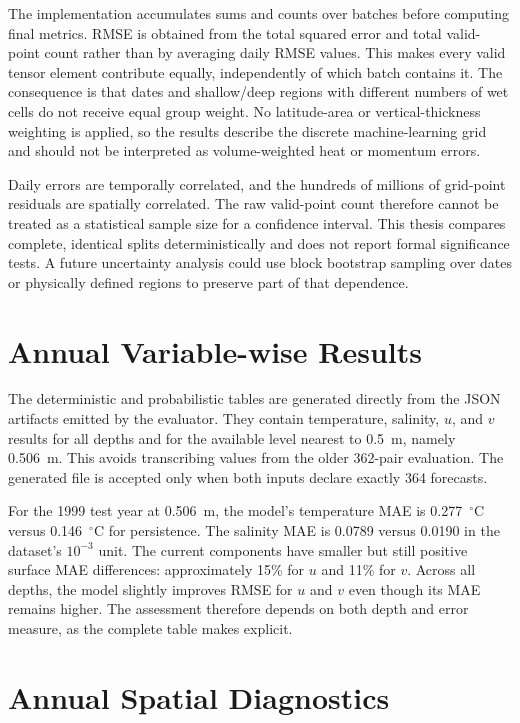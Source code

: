 The implementation accumulates sums and counts over batches before computing final metrics. RMSE is obtained from the total squared error and total valid-point count rather than by averaging daily RMSE values. This makes every valid tensor element contribute equally, independently of which batch contains it. The consequence is that dates and shallow/deep regions with different numbers of wet cells do not receive equal group weight. No latitude-area or vertical-thickness weighting is applied, so the results describe the discrete machine-learning grid and should not be interpreted as volume-weighted heat or momentum errors.

Daily errors are temporally correlated, and the hundreds of millions of grid-point residuals are spatially correlated. The raw valid-point count therefore cannot be treated as a statistical sample size for a confidence interval. This thesis compares complete, identical splits deterministically and does not report formal significance tests. A future uncertainty analysis could use block bootstrap sampling over dates or physically defined regions to preserve part of that dependence.

\section{Annual Variable-wise Results}

The deterministic and probabilistic tables are generated directly from the JSON artifacts emitted by the evaluator. They contain temperature, salinity, $u$, and $v$ results for all depths and for the available level nearest to 0.5~m, namely 0.506~m. This avoids transcribing values from the older 362-pair evaluation. The generated file is accepted only when both inputs declare exactly 364 forecasts.



For the 1999 test year at 0.506~m, the model's temperature MAE is 0.277~$^{\circ}$C versus 0.146~$^{\circ}$C for persistence. The salinity MAE is 0.0789 versus 0.0190 in the dataset's $10^{-3}$ unit. The current components have smaller but still positive surface MAE differences: approximately 15\% for $u$ and 11\% for $v$. Across all depths, the model slightly improves RMSE for $u$ and $v$ even though its MAE remains higher. The assessment therefore depends on both depth and error measure, as the complete table makes explicit.

\section{Annual Spatial Diagnostics}

